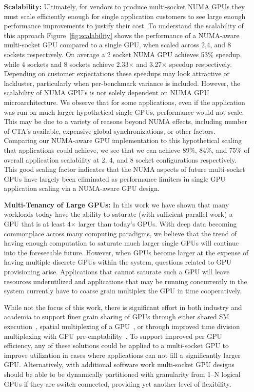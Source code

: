 \textbf{Scalability:} Ultimately, for vendors to produce multi-socket NUMA 
GPUs they must scale efficiently enough for single application customers to 
see large enough performance improvements to justify their cost.  To 
understand the scalability of this approach Figure~\ref{fig:scalability} 
shows the performance of a NUMA-aware multi-socket GPU compared to a single 
GPU, when scaled across 2,4, and 8 sockets respectively.  On average a 2 
socket NUMA GPU achieves 53\% speedup, while 4 sockets and 8 sockets achieve 
2.33$\times$ and 3.27$\times$ speedup respectively.  Depending on customer expectations these 
speedups may look attractive or lackluster, particularly when per-benchmark 
variance is included.  However, the scalability of NUMA GPU's is not solely 
dependent on NUMA GPU microarchitecture. We observe that for some 
applications, even if the application was run on much larger hypothetical 
single GPUs, performance would not scale.  This may be due to a variety of 
reasons beyond NUMA effects, including number of CTA's available, expensive 
global synchronizations, or other factors.  Comparing our NUMA-aware GPU 
implementation to this hypothetical scaling that applications could achieve, 
we see that we can achieve 89\%, 84\%, and 75\% of overall application 
scalability at 2, 4, and 8 socket configurations respectively.  This good 
scaling factor indicates that the NUMA aspects of future multi-socket GPUs 
have largely been eliminated as performance limiters in single GPU 
application scaling via a NUMA-aware GPU design.

\textbf{Multi-Tenancy of Large GPUs:} In this work we have shown that many 
workloads today have the ability to saturate (with sufficient parallel work) 
a GPU that is at least 4$\times$ larger than today's GPUs.  With deep data 
becoming commonplace across many computing paradigms, we believe that the 
trend of having enough computation to saturate much larger single GPUs will 
continue into the foreseeable future. However, when GPUs become larger at the 
expense of having multiple discrete GPUs within the system, questions related 
to GPU provisioning arise.  Applications that cannot saturate such a GPU will 
leave resources underutilized and applications that may be running 
concurrently in the system currently have to coarse grain multiplex the GPU 
in time cooperatively. 

While not the focus of this work, there is significant effort in both 
industry and academia to support finer grain sharing of GPUs through either 
shared SM execution~\cite{tanasic2014enabling}, spatial multiplexing of a 
GPU~\cite{park2015chimera}, or through improved time division multiplexing 
with GPU pre-emptability~\cite{lin2016enabling}.  To support improved per GPU 
efficiency, any of these solutions could be applied to a multi-socket GPU to 
improve utilization in cases where applications can not fill a significantly 
larger GPU.  Alternatively, with additional software work multi-socket GPU 
designs should be able to be dynamically partitioned with granularity from 
1--N logical GPUs if they are switch connected, providing yet another level 
of flexibility.

